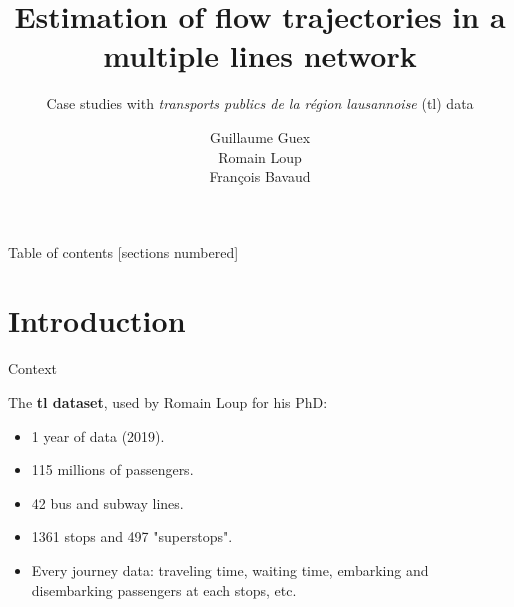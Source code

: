 \documentclass[10pt]{beamer}
\title{Estimation of flow trajectories in a multiple lines network}
\subtitle{Case studies with \textit{transports publics de la région lausannoise} (tl) data}
\date{}
\author{Guillaume Guex \\ Romain Loup \\ François Bavaud}
\institute{University of Lausanne}
\newcommand{\imp}[1]{\textbf{\color{cyan}#1}}
\begin{document}
	
	
	\maketitle
	
	
	\begin{frame}{Table of contents}
		[sections numbered]
		\tableofcontents%
	\end{frame}

	
	\section[Introduction]{Introduction}
	
	
	\begin{frame}{Context}
		
		The \imp{tl dataset}, used by Romain Loup for his PhD:
		
		\begin{itemize}
			\item 1 year of data (2019).
			\item 115 millions of passengers.
			\item 42 bus and subway lines.
			\item 1361 stops and 497 "superstops".
			\item Every journey data: traveling time, waiting time, embarking and disembarking passengers at each stops, etc.
		\end{itemize}
		
	\end{frame}

	
\end{document}
